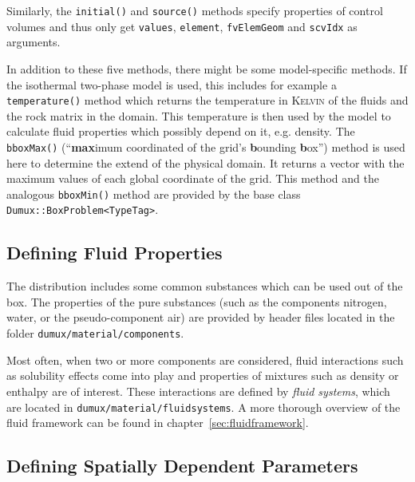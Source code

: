 Similarly, the \texttt{initial()} and \texttt{source()} methods
specify properties of control volumes and thus only get
\texttt{values}, \texttt{element}, \texttt{fvElemGeom} and
\texttt{scvIdx} as arguments.

In addition to these five methods, there might be some model-specific
methods. If the isothermal two-phase model is used, this includes for
example a \texttt{temperature()} method which returns the temperature
in \textsc{Kelvin} of the fluids and the rock matrix in the
domain. This temperature is then used by the model to calculate fluid
properties which possibly depend on it, e.g. density. The
\texttt{bboxMax()} (``\textbf{max}imum coordinated of the grid's
\textbf{b}ounding \textbf{b}ox'') method is used here to
determine the extend of the physical domain. It returns a vector with the
maximum values of each global coordinate of the grid. This method
and the analogous \texttt{bboxMin()} method are provided by the base
class \texttt{Dumux::BoxProblem<TypeTag>}.

\subsection{Defining Fluid Properties}\label{tutorial-coupled:description-fluid-class}

The \Dumux distribution includes some common substances which can be
used out of the box. The properties of the pure substances (such as
the components nitrogen, water, or the pseudo-component air) are
provided by header files located in the folder
\verb+dumux/material/components+.

Most often, when two or more components are considered, fluid
interactions such as solubility effects come into play and properties
of mixtures such as density or enthalpy are of interest. These
interactions are defined by {\em fluid systems}, which are located in
\verb+dumux/material/fluidsystems+. A more thorough overview of the
\Dumux fluid framework can be found in chapter~\ref{sec:fluidframework}.


\subsection{Defining Spatially Dependent Parameters}\label{tutorial-coupled:description-spatialParameters}

